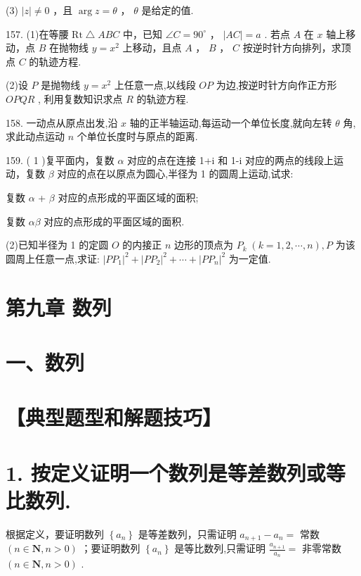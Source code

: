 \documentclass[10pt]{article}
\newcommand*\circled[1]{\tikz[baseline=(char.base)]{\node[shape=circle,draw,inner sep=1.5pt] (char) {\small #1};}}
\begin{document}
(3) \(\left| z\right|  \neq  0\) ，且 \(\arg z = \theta\) ， \(\theta\) 是给定的值.

157. (1)在等腰 \(\mathrm{{Rt}} \bigtriangleup  {ABC}\) 中，已知 \(\angle C = {90}^{ \circ  }\) ， \(\left| {AC}\right|  = a\) . 若点 \(A\) 在 \(x\) 轴上移动，点 \(B\) 在抛物线 \(y = {x}^{2}\) 上移动，且点 \(A\) ， \(B\) ， \(C\) 按逆时针方向排列，求顶点 \(C\) 的轨迹方程.

(2)设 \(P\) 是抛物线 \(y = {x}^{2}\) 上任意一点,以线段 \({OP}\) 为边,按逆时针方向作正方形 \({OPQR}\) , 利用复数知识求点 \(R\) 的轨迹方程.

158. 一动点从原点出发,沿 \(x\) 轴的正半轴运动,每运动一个单位长度,就向左转 \(\theta\) 角,求此动点运动 \(n\) 个单位长度时与原点的距离.

159. ( 1 )复平面内，复数 \(\alpha\) 对应的点在连接 1+i 和 1-i 对应的两点的线段上运动，复数 \(\beta\) 对应的点在以原点为圆心,半径为 1 的圆周上运动,试求:

 \circled{1}  复数 \(\alpha\) + \(\beta\) 对应的点形成的平面区域的面积;

 \circled{2}  复数 \({\alpha \beta }\) 对应的点形成的平面区域的面积.

(2)已知半径为 1 的定圆 \(O\) 的内接正 \(n\) 边形的顶点为 \({P}_{k}\;\left( {k = 1,2,\cdots ,n}\right) ,P\) 为该圆周上任意一点,求证: \({\left| P{P}_{1}\right| }^{2} + {\left| P{P}_{2}\right| }^{2} + \cdots  + {\left| P{P}_{n}\right| }^{2}\) 为一定值.

\section*{第九章 数列}

\section*{一、数列}

\section*{【典型题型和解题技巧】}

\section*{1. 按定义证明一个数列是等差数列或等比数列.}

根据定义，要证明数列 \(\left\{  {a}_{n}\right\}\) 是等差数列，只需证明 \({a}_{n + 1} - {a}_{n} =\) 常数 \(\left( {n \in  \mathbf{N},n > 0}\right)\) ；要证明数列 \(\left\{  {a}_{n}\right\}\) 是等比数列,只需证明 \(\frac{{a}_{n + 1}}{{a}_{n}} =\) 非零常数 \(\left( {n \in  \mathbf{N},n > 0}\right)\) .
\end{document}
